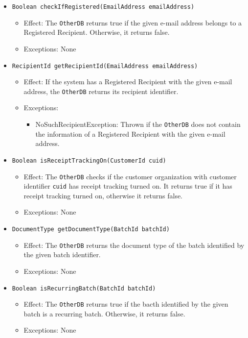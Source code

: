 \documentclass[a4paper,10pt]{article}
\begin{document}
\begin{itemize}
\begin{itemize}
           \item \texttt{Boolean checkIfRegistered(EmailAddress emailAddress) }        
		\begin{itemize}
			\item Effect: The \texttt{OtherDB} returns true if the given e-mail address belongs to a Registered Recipient. Otherwise, it returns false.
			\item Exceptions: None
		\end{itemize}
		
		   \item \texttt{RecipientId getRecipientId(EmailAddress emailAddress) }        
		\begin{itemize}
			\item Effect: If the system has a Registered Recipient with the given e-mail address, the \texttt{OtherDB} returns its recipient identifier.
			\item Exceptions: 
			\begin{itemize}
				\item NoSuchRecipientException: Thrown if the \texttt{OtherDB} does not contain the information of a Registered Recipient with the given e-mail address.
			\end{itemize}
		\end{itemize}  		

		\item \texttt{Boolean isReceiptTrackingOn(CustomerId cuid)}        
		\begin{itemize}
			\item Effect: The \texttt{OtherDB} checks if the customer organization with customer identifier \texttt{cuid} has receipt tracking turned on. It returns true if it has receipt tracking turned on, otherwise it returns false.
			\item Exceptions: None
		\end{itemize}
		
		\item \texttt{DocumentType getDocumentType(BatchId batchId)}        
		\begin{itemize}
			\item Effect: The \texttt{OtherDB} returns the document type of the batch identified by the given batch identifier.
			\item Exceptions: None
		\end{itemize}

		\item \texttt{Boolean isRecurringBatch(BatchId batchId)}        
		\begin{itemize}
			\item Effect: The \texttt{OtherDB} returns true if the bacth identified by the given batch is a recurring batch. Otherwise, it returns false.
			\item Exceptions: None
		\end{itemize}
		

\end{itemize}
\end{itemize}
\end{document}
